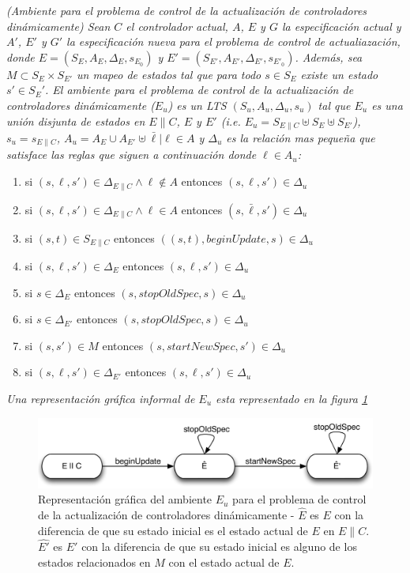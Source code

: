 \begin{nahaDef}
\emph{(Ambiente para el problema de control de la actualización de controladores dinámicamente) Sean $C$ el controlador
actual, $A$, $E$ y $G$ la especificación actual y $A'$, $E'$ y $G'$ la especificación nueva para el problema de
control de actualiazación, donde $E = (S_E, A_E, \Delta_E, s_{E_0})$ y $E' = (S_{E'}, A_{E'}, \Delta_{E'}, s_{E'_0})$.
Además, sea $M \subset S_E \times S_{E'}$ un mapeo de estados tal que para todo $s \in S_E$ existe un estado $s' \in
{S_E'}$. El ambiente para el problema de control de la actualización de controladores dinámicamente ($E_u$) es un LTS
$(S_u,A_u,\Delta_u,s_u)$ tal que $E_u$ es una unión disjunta de estados en $E\|C$, $E$ y $E'$ (i.e. $E_u = S_{E\|C}
\uplus S_E \uplus S_{E'}$), $s_u = s_{E\|C}$, $A_u = A_E \cup A_{E'} \uplus \bar{\ell}|\ell \in A$ y $\Delta_u$ es la relación mas
pequeña que satisface las reglas que siguen a continuación donde $\ell \in A_u$:}

\begin{enumerate}
\label{update_environment_def}
\itemsep-4mm
\renewcommand*\labelenumi{[\theenumi]}
\item si $(s,\ell,s') \in \Delta_{E\|C} \wedge \ell \notin A$ entonces $(s,\ell,s') \in \Delta_u$
\item si $(s,\ell,s') \in \Delta_{E\|C} \wedge \ell \in A$ entonces $(s,\bar{\ell},s') \in \Delta_u$
\item si $(s,t) \in S_{E\|C}$ entonces $((s,t), beginUpdate,s) \in \Delta_u$
\item si $(s,\ell,s') \in \Delta_E$ entonces $(s,\ell,s') \in \Delta_u$
\item si $s \in \Delta_E$ entonces $(s,stopOldSpec,s) \in \Delta_u$
\item si $s \in \Delta_{E'}$ entonces $(s,stopOldSpec,s) \in \Delta_u$
\item si $(s,s') \in M$ entonces $(s,startNewSpec,s') \in \Delta_u$
\item si $(s,\ell,s') \in \Delta_{E'}$ entonces $(s,\ell,s') \in \Delta_u$
\end{enumerate}
\emph{Una representación gráfica informal de $E_u$ esta representado en la figura \ref{update_environment}}
\end{nahaDef}

\begin{figure}
\centering
\includegraphics[scale=0.35]{img/E_u.png}
\caption{Representación gráfica del ambiente $E_u$ para el problema de control de la actualización de controladores
dinámicamente - $\hat{E}$ es $E$ con la diferencia de que su estado inicial es el estado actual de $E$ en $E\|C$.
$\hat{E'}$ es $E'$ con la diferencia de que su estado inicial es alguno de los estados relacionados en $M$ con el estado
actual de $E$.}
\label{update_environment}
\end{figure}

